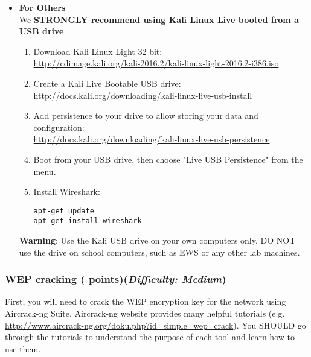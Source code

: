 \begin{itemize}
  \item \textbf{For Others}\\
  We \textbf{STRONGLY recommend using Kali Linux Live booted from a USB drive}.
  \begin{enumerate}[nosep]
    \item Download Kali Linux Light 32 bit:\\
    \url{http://cdimage.kali.org/kali-2016.2/kali-linux-light-2016.2-i386.iso}
    \item Create a Kali Live Bootable USB drive:\\
    \url{http://docs.kali.org/downloading/kali-linux-live-usb-install}
    \item Add persistence to your drive to allow storing your data and configuration:\\
    \url{http://docs.kali.org/downloading/kali-linux-live-usb-persistence}
    \item Boot from your USB drive, then choose "Live USB Persistence" from the menu.
    \item Install Wireshark:
    \vspace{-4pt}
    \begin{mdframed}
    \begin{Verbatim}
apt-get update
apt-get install wireshark
    \end{Verbatim}
    \end{mdframed}
    \end{enumerate}
  \textbf{Warning}: Use the Kali USB drive on your own computers only. DO NOT use the drive on school computers, such as EWS or any other lab machines.

\end{itemize}

\pagebreak

\subsubsection{WEP cracking ( points)\hfill\rm\normalsize (\emph{Difficulty: Medium})}
\label{ssec:wep}
\newcommand{\filewep}{\ref*{ssec:wep}.txt}

First, you will need to crack the WEP encryption key for the network using Aircrack-ng Suite. Aircrack-ng website provides many helpful tutorials (e.g. \url{http://www.aircrack-ng.org/doku.php?id=simple\_wep\_crack}). You SHOULD go through the tutorials to understand the purpose of each tool and learn how to use them.

